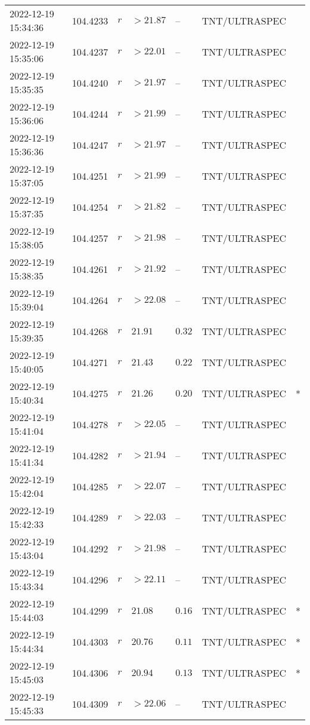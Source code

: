 \documentclass{nature_plusfigure}
\begin{document}
\begin{supplement}
\begin{center}
\begin{longtable}{lllllll}
2022-12-19 15:34:36 & 104.4233 & $r$ & $>21.87$ & -- & TNT/ULTRASPEC &  \\ 
2022-12-19 15:35:06 & 104.4237 & $r$ & $>22.01$ & -- & TNT/ULTRASPEC &  \\ 
2022-12-19 15:35:35 & 104.4240 & $r$ & $>21.97$ & -- & TNT/ULTRASPEC &  \\ 
2022-12-19 15:36:06 & 104.4244 & $r$ & $>21.99$ & -- & TNT/ULTRASPEC &  \\ 
2022-12-19 15:36:36 & 104.4247 & $r$ & $>21.97$ & -- & TNT/ULTRASPEC &  \\ 
2022-12-19 15:37:05 & 104.4251 & $r$ & $>21.99$ & -- & TNT/ULTRASPEC &  \\ 
2022-12-19 15:37:35 & 104.4254 & $r$ & $>21.82$ & -- & TNT/ULTRASPEC &  \\ 
2022-12-19 15:38:05 & 104.4257 & $r$ & $>21.98$ & -- & TNT/ULTRASPEC &  \\ 
2022-12-19 15:38:35 & 104.4261 & $r$ & $>21.92$ & -- & TNT/ULTRASPEC &  \\ 
2022-12-19 15:39:04 & 104.4264 & $r$ & $>22.08$ & -- & TNT/ULTRASPEC &  \\ 
2022-12-19 15:39:35 & 104.4268 & $r$ & $21.91$ & $0.32$ & TNT/ULTRASPEC &  \\ 
2022-12-19 15:40:05 & 104.4271 & $r$ & $21.43$ & $0.22$ & TNT/ULTRASPEC &  \\ 
2022-12-19 15:40:34 & 104.4275 & $r$ & $21.26$ & $0.20$ & TNT/ULTRASPEC & * \\ 
2022-12-19 15:41:04 & 104.4278 & $r$ & $>22.05$ & -- & TNT/ULTRASPEC &  \\ 
2022-12-19 15:41:34 & 104.4282 & $r$ & $>21.94$ & -- & TNT/ULTRASPEC &  \\ 
2022-12-19 15:42:04 & 104.4285 & $r$ & $>22.07$ & -- & TNT/ULTRASPEC &  \\ 
2022-12-19 15:42:33 & 104.4289 & $r$ & $>22.03$ & -- & TNT/ULTRASPEC &  \\ 
2022-12-19 15:43:04 & 104.4292 & $r$ & $>21.98$ & -- & TNT/ULTRASPEC &  \\ 
2022-12-19 15:43:34 & 104.4296 & $r$ & $>22.11$ & -- & TNT/ULTRASPEC &  \\ 
2022-12-19 15:44:03 & 104.4299 & $r$ & $21.08$ & $0.16$ & TNT/ULTRASPEC & * \\ 
2022-12-19 15:44:34 & 104.4303 & $r$ & $20.76$ & $0.11$ & TNT/ULTRASPEC & * \\ 
2022-12-19 15:45:03 & 104.4306 & $r$ & $20.94$ & $0.13$ & TNT/ULTRASPEC & * \\ 
2022-12-19 15:45:33 & 104.4309 & $r$ & $>22.06$ & -- & TNT/ULTRASPEC &  \\ 

\end{longtable}
\end{center}
\end{supplement}
\end{document}
